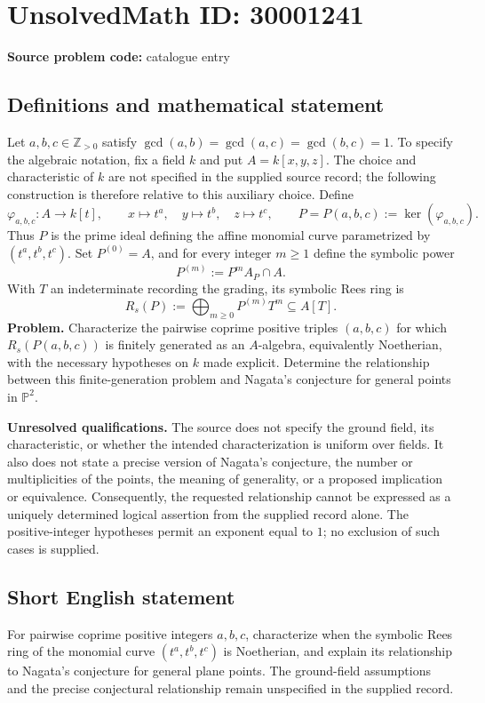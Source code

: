 \documentclass[11pt]{article}
\newcommand{\Z}{\mathbb{Z}}
\begin{document}
\section*{UnsolvedMath ID: 30001241}
\textbf{Source problem code:} catalogue entry
\subsection{Definitions and mathematical statement}
Let \(a,b,c\in\Z_{>0}\) satisfy \(\gcd(a,b)=\gcd(a,c)=\gcd(b,c)=1\). To specify the algebraic notation, fix a field \(k\) and put \(A=k[x,y,z]\). The choice and characteristic of \(k\) are not specified in the supplied source record; the following construction is therefore relative to this auxiliary choice. Define
\[
\varphi_{a,b,c}:A\longrightarrow k[t],\qquad x\longmapsto t^a,\quad y\longmapsto t^b,\quad z\longmapsto t^c,
\qquad P=P(a,b,c):=\ker(\varphi_{a,b,c}).
\]
Thus \(P\) is the prime ideal defining the affine monomial curve parametrized by \((t^a,t^b,t^c)\). Set \(P^{(0)}=A\), and for every integer \(m\geq1\) define the symbolic power
\[
P^{(m)}:=P^mA_P\cap A.
\]
With \(T\) an indeterminate recording the grading, its symbolic Rees ring is
\[
R_s(P):=\bigoplus_{m\geq0}P^{(m)}T^m\subseteq A[T].
\]
\textbf{Problem.} Characterize the pairwise coprime positive triples \((a,b,c)\) for which \(R_s(P(a,b,c))\) is finitely generated as an \(A\)-algebra, equivalently Noetherian, with the necessary hypotheses on \(k\) made explicit. Determine the relationship between this finite-generation problem and Nagata's conjecture for general points in \(\mathbb P^2\).

\textbf{Unresolved qualifications.} The source does not specify the ground field, its characteristic, or whether the intended characterization is uniform over fields. It also does not state a precise version of Nagata's conjecture, the number or multiplicities of the points, the meaning of generality, or a proposed implication or equivalence. Consequently, the requested relationship cannot be expressed as a uniquely determined logical assertion from the supplied record alone. The positive-integer hypotheses permit an exponent equal to \(1\); no exclusion of such cases is supplied.
\subsection{Short English statement}
For pairwise coprime positive integers \(a,b,c\), characterize when the symbolic Rees ring of the monomial curve \((t^a,t^b,t^c)\) is Noetherian, and explain its relationship to Nagata's conjecture for general plane points. The ground-field assumptions and the precise conjectural relationship remain unspecified in the supplied record.
\end{document}
